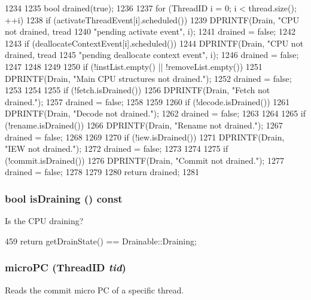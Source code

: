 \begin{DoxyCode}
1234 {
1235     bool drained(true);
1236 
1237     for (ThreadID i = 0; i < thread.size(); ++i) {
1238         if (activateThreadEvent[i].scheduled()) {
1239             DPRINTF(Drain, "CPU not drained, tread %
1240                     "pending activate event\n", i);
1241             drained = false;
1242         }
1243         if (deallocateContextEvent[i].scheduled()) {
1244             DPRINTF(Drain, "CPU not drained, tread %
1245                     "pending deallocate context event\n", i);
1246             drained = false;
1247         }
1248     }
1249 
1250     if (!instList.empty() || !removeList.empty()) {
1251         DPRINTF(Drain, "Main CPU structures not drained.\n");
1252         drained = false;
1253     }
1254 
1255     if (!fetch.isDrained()) {
1256         DPRINTF(Drain, "Fetch not drained.\n");
1257         drained = false;
1258     }
1259 
1260     if (!decode.isDrained()) {
1261         DPRINTF(Drain, "Decode not drained.\n");
1262         drained = false;
1263     }
1264 
1265     if (!rename.isDrained()) {
1266         DPRINTF(Drain, "Rename not drained.\n");
1267         drained = false;
1268     }
1269 
1270     if (!iew.isDrained()) {
1271         DPRINTF(Drain, "IEW not drained.\n");
1272         drained = false;
1273     }
1274 
1275     if (!commit.isDrained()) {
1276         DPRINTF(Drain, "Commit not drained.\n");
1277         drained = false;
1278     }
1279 
1280     return drained;
1281 }
\end{DoxyCode}
\hypertarget{classFullO3CPU_a8256d21571cb453f728d6b85e6fc6d15}{
\subsubsection[{isDraining}]{\setlength{\rightskip}{0pt plus 5cm}bool isDraining () const}}
\label{classFullO3CPU_a8256d21571cb453f728d6b85e6fc6d15}
Is the CPU draining? 


\begin{DoxyCode}
459 { return getDrainState() == Drainable::Draining; }
\end{DoxyCode}
\hypertarget{classFullO3CPU_aa295441afc0fa8f449dc1a0cb7c7b994}{
\subsubsection[{microPC}]{ microPC ({\bf ThreadID} {\em tid})}}
\label{classFullO3CPU_aa295441afc0fa8f449dc1a0cb7c7b994}
Reads the commit micro PC of a specific thread. 


